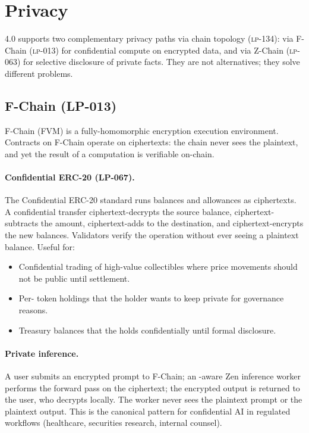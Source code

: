 \section{Privacy}
\label{sec:privacy}

\Zoo{} 4.0 supports two complementary privacy paths via \Lux{}
chain topology (\textsc{lp-134}): \FHE{} via F-Chain
(\textsc{lp-013}) for confidential compute on encrypted data, and
\ZKP{} via Z-Chain (\textsc{lp-063}) for selective disclosure of
private facts. They are not alternatives; they solve different
problems.

\subsection{F-Chain \FHE{} (LP-013)}

F-Chain (FVM) is a fully-homomorphic encryption execution
environment. Contracts on F-Chain operate on ciphertexts: the chain
never sees the plaintext, and yet the result of a computation is
verifiable on-chain.

\paragraph{Confidential ERC-20 (LP-067).}
The Confidential ERC-20 standard runs balances and allowances as
ciphertexts. A confidential transfer ciphertext-decrypts the source
balance, ciphertext-subtracts the amount, ciphertext-adds to the
destination, and ciphertext-encrypts the new balances. Validators
verify the operation without ever seeing a plaintext balance. Useful
for:

\begin{itemize}[leftmargin=1.2em]
  \item Confidential trading of high-value collectibles where price
        movements should not be public until settlement.
  \item Per-\LLM{} token holdings that the holder wants to keep
        private for governance reasons.
  \item Treasury balances that the \DAO{} holds confidentially until
        formal disclosure.
\end{itemize}

\paragraph{Private inference.}
A user submits an encrypted prompt to F-Chain; an \FHE{}-aware Zen
inference worker performs the forward pass on the ciphertext; the
encrypted output is returned to the user, who decrypts locally. The
worker never sees the plaintext prompt or the plaintext output. This
is the canonical pattern for confidential AI in regulated workflows
(healthcare, securities research, internal counsel).

